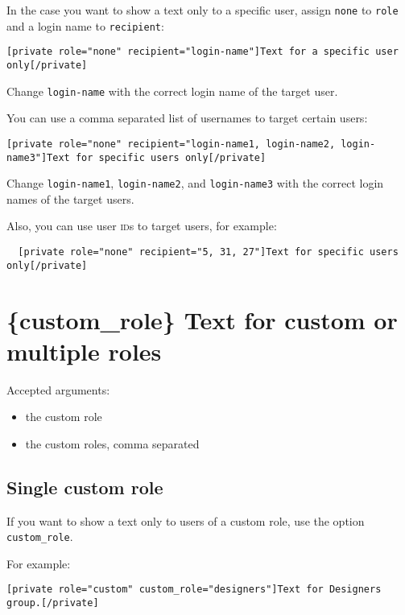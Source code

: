 In the case you want to show a text only to a specific user, assign \verb+none+
to \verb+role+ and a login name to \verb+recipient+:

\begin{lstlisting}
[private role="none" recipient="login-name"]Text for a specific user only[/private]
\end{lstlisting}

Change \verb+login-name+ with the correct login name of the target user.

You can use a comma separated list of usernames to target certain users:

\begin{lstlisting}
[private role="none" recipient="login-name1, login-name2, login-name3"]Text for specific users only[/private]
\end{lstlisting}

Change \verb+login-name1+, \verb+login-name2+, and \verb+login-name3+ with the
correct login names of the target users.

Also, you can use user \textsc{id}s to target users, for example:

\begin{lstlisting}
  [private role="none" recipient="5, 31, 27"]Text for specific users only[/private]
\end{lstlisting}

\section{\{custom\_role\} Text for custom or multiple roles}

Accepted arguments:

\begin{itemize}
 \item the custom role
 \item the custom roles, comma separated
\end{itemize}

\subsection{Single custom role}

If you want to show a text only to users of a custom role, use the option
\verb+custom_role+.

For example:

\begin{lstlisting}
[private role="custom" custom_role="designers"]Text for Designers group.[/private]
\end{lstlisting}


